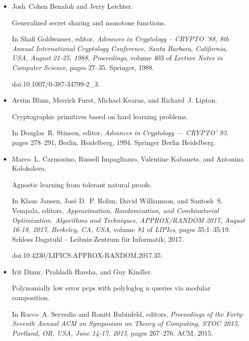 \begin{itemize}
\item[] 
[5]

Josh Cohen Benaloh and Jerry Leichter.


Generalized secret sharing and monotone functions.


In Shafi Goldwasser, editor, \emph{Advances in Cryptology – CRYPTO
’88, 8th Annual International Cryptology Conference, Santa Barbara,
California, USA, August 21-25, 1988, Proceedings}, volume 403 of \emph{Lecture
Notes in Computer Science}, pages 27–35. Springer, 1988.


doi:10.1007/0-387-34799-2\_3.





\item[] 
[6]

Avrim Blum, Merrick Furst, Michael Kearns, and Richard J. Lipton.


Cryptographic primitives based on hard learning problems.


In Douglas R. Stinson, editor, \emph{Advances in Cryptology —
CRYPTO’ 93}, pages 278–291, Berlin, Heidelberg, 1994. Springer Berlin
Heidelberg.





\item[] 
[7]

Marco L. Carmosino, Russell Impagliazzo, Valentine Kabanets, and Antonina
Kolokolova.


Agnostic learning from tolerant natural proofs.


In Klaus Jansen, José D. P. Rolim, David Williamson, and
Santosh S. Vempala, editors, \emph{Approximation, Randomization, and
Combinatorial Optimization. Algorithms and Techniques, APPROX/RANDOM 2017,
August 16-18, 2017, Berkeley, CA, USA}, volume 81 of \emph{LIPIcs}, pages
35:1–35:19. Schloss Dagstuhl – Leibniz-Zentrum für Informatik, 2017.


doi:10.4230/LIPICS.APPROX-RANDOM.2017.35.





\item[] 
[8]

Irit Dinur, Prahladh Harsha, and Guy Kindler.


Polynomially low error pcps with polyloglog n queries via modular
composition.


In Rocco A. Servedio and Ronitt Rubinfeld, editors, \emph{Proceedings
of the Forty-Seventh Annual ACM on Symposium on Theory of Computing, STOC
2015, Portland, OR, USA, June 14-17, 2015}, pages 267–276. ACM, 2015.



\end{itemize}
